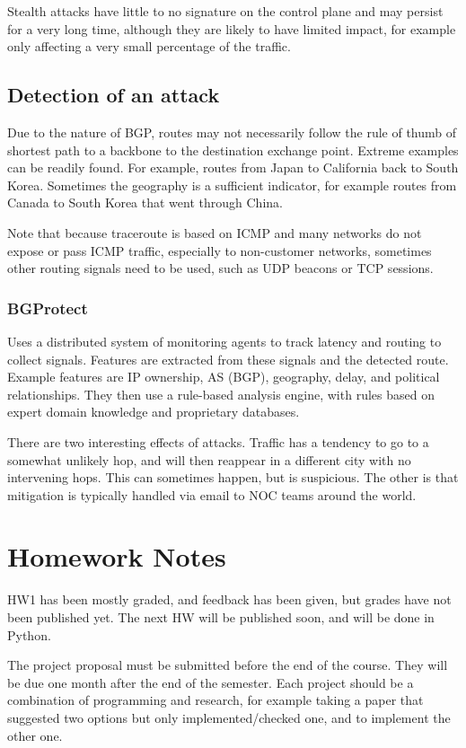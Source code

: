 \documentclass{idc_msc}
\begin{document}
Stealth attacks have little to no signature on the control plane and may persist for a very long time, although they are likely to have limited impact, for example only affecting a very small percentage of the traffic.

\subsection{Detection of an attack}

Due to the nature of BGP, routes may not necessarily follow the rule of thumb of shortest path to a backbone to the destination exchange point. Extreme examples can be readily found. For example, routes from Japan to California back to South Korea.
Sometimes the geography is a sufficient indicator, for example routes from Canada to South Korea that went through China.

Note that because traceroute is based on ICMP and many networks do not expose or pass ICMP traffic, especially to non-customer networks, sometimes other routing signals need to be used, such as UDP beacons or TCP sessions.

\subsubsection{BGProtect}

Uses a distributed system of monitoring agents to track latency and routing to collect signals. Features are extracted from these signals and the detected route. Example features are IP ownership, AS (BGP), geography, delay, and political relationships.
They then use a rule-based analysis engine, with rules based on expert domain knowledge and proprietary databases.

There are two interesting effects of attacks. Traffic has a tendency to go to a somewhat unlikely hop, and will then reappear in a different city with no intervening hops. This can sometimes happen, but is suspicious. The other is that mitigation is typically handled via email to NOC teams around the world.

\section{Homework Notes}

HW1 has been mostly graded, and feedback has been given, but grades have not been published yet.
The next HW will be published soon, and will be done in Python.

The project proposal must be submitted before the end of the course.
They will be due one month after the end of the semester.
Each project should be a combination of programming and research, for example taking a paper that suggested two options but only implemented/checked one, and to implement the other one.
\end{document}
